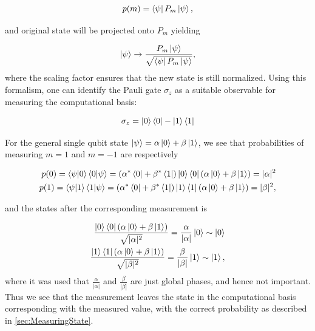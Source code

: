 \begin{equation}
    p(m) = \bra{\psi}P_m\ket{\psi},
\end{equation}

and original state will be projected onto $P_m$ yielding 

\begin{equation}
    \ket{\psi} \rightarrow \frac{P_m\ket{\psi}}{\sqrt{\bra{\psi}P_m\ket{\psi}}},
\end{equation}
where the scaling factor ensures that the new state is still normalized. Using this formalism, one can identify the Pauli gate $\sigma_z$ as a suitable observable for measuring the computational basis:

\begin{equation}
    \sigma_z = \ket{0}\bra{0} - \ket{1}\bra{1}
\end{equation}

For the general single qubit state $\ket{\psi} = \alpha \ket{0} + \beta \ket{1}$, we see that probabilities of measuring $m=1$ and $m=-1$ are respectively

\begin{equation}
\begin{aligned}
    p(0) = \bra{\psi} \ket{0}\bra{0} \ket{\psi} = (\alpha^* \bra{0} + \beta^* \bra{1}) \ket{0}\bra{0} (\alpha \ket{0} + \beta \ket{1}) = |\alpha|^2\\
    p(1) = \bra{\psi} \ket{1}\bra{1} \ket{\psi} = (\alpha^* \bra{0} + \beta^* \bra{1}) \ket{1}\bra{1} (\alpha \ket{0} + \beta \ket{1}) = |\beta|^2,
\end{aligned}
\end{equation}

and the states after the corresponding measurement is 


\begin{equation}\label{eq:CompBasisMeasurement}
\begin{aligned}
    \frac{\ket{0}\bra{0}(\alpha \ket{0} + \beta \ket{1})}{\sqrt{|\alpha|^2}} = 
    \frac{\alpha}{|\alpha|} \ket{0} \sim \ket{0} \\
    \frac{\ket{1}\bra{1}(\alpha \ket{0} + \beta \ket{1})}{\sqrt{|\beta|^2}} = 
    \frac{\beta}{|\beta|} \ket{1} \sim \ket{1},
\end{aligned}
\end{equation}
where it was used that $\frac{\alpha}{|\alpha|}$ and $\frac{\beta}{|\beta|}$ are just global phases, and hence not important. Thus we see that the measurement leaves the state in the computational basis corresponding with the measured value, with the correct probability as described in \autoref{sec:MeasuringState}.

